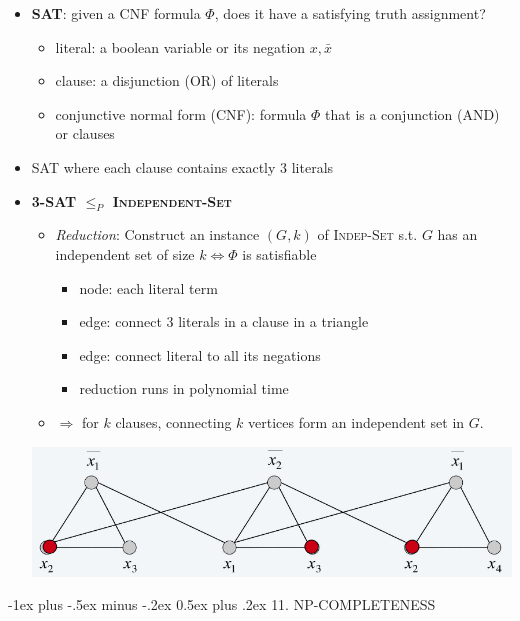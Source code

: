 \documentclass[10pt, landscape]{article}
\makeatletter
\renewcommand{\section}{\@startsection{section}{1}{0mm}%
  {-1ex plus -.5ex minus -.2ex}%
  {0.5ex plus .2ex}%
{\normalfont\large\bfseries}}
\makeatother
\begin{document}
\begin{multicols*}{4}
  \begin{itemize}
    \item \textbf{SAT}: given a CNF formula $\Phi$, does it have a satisfying truth assignment?
      \begin{itemize}
        \item literal: a boolean variable or its negation $x, \bar{x}$
        \item clause: a disjunction (OR) of literals
        \item conjunctive normal form (CNF): formula $\Phi$ that is a conjunction (AND) or clauses
      \end{itemize}
    \item {} SAT where each clause contains exactly $3$ literals
    \item \textbf{3-SAT $\leq_P$ \textsc{Independent-Set}}
      \begin{itemize}
        \item \textit{Reduction}: Construct an instance $(G, k)$ of \textsc{Indep-Set} s.t. $G$ has an independent set of size $k \iff \Phi$ is satisfiable
          \begin{itemize}
            \item node: each literal term
            \item edge: connect 3 literals in a clause in a triangle
            \item edge: connect literal to all its negations
            \item reduction runs in polynomial time
          \end{itemize}
        \item $\Rightarrow$ for $k$ clauses, connecting $k$ vertices form an independent set in $G$. 
      \end{itemize}
      \includegraphics[width=0.95\linewidth]{cs3230-3sat-indepset-reduction.png} 
  \end{itemize}

  \section{11. NP-COMPLETENESS}


\end{multicols*}
\end{document}
